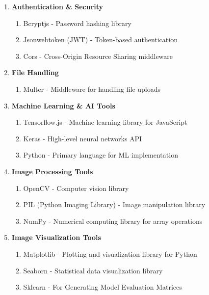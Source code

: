 \begin{enumerate}[label=\roman*.]
    \item \textbf{Authentication \& Security}
          \begin{enumerate}[label=$\bullet$]
              \item Bcryptjs \-- Password hashing library
              \item Jsonwebtoken (JWT) \-- Token-based authentication
              \item Cors \-- Cross-Origin Resource Sharing middleware
          \end{enumerate}

    \item \textbf{File Handling}
          \begin{enumerate}[label=$\bullet$]
              \item Multer \-- Middleware for handling file uploads
          \end{enumerate}

    \item \textbf{Machine Learning \& AI Tools}
          \begin{enumerate}[label=$\bullet$]
              \item Tensorflow.js \-- Machine learning library for JavaScript
              \item Keras \-- High-level neural networks API
              \item Python \-- Primary language for ML implementation
          \end{enumerate}

    \item \textbf{Image Processing Tools}
          \begin{enumerate}[label=$\bullet$]
              \item OpenCV \-- Computer vision library
              \item PIL (Python Imaging Library) \-- Image manipulation library
              \item NumPy \-- Numerical computing library for array operations
          \end{enumerate}

    \item \textbf{Image Visualization Tools}
          \begin{enumerate}[label=$\bullet$]
              \item Matplotlib \-- Plotting and visualization library for Python
              \item Seaborn \-- Statistical data visualization library
              \item Sklearn \-- For Generating Model Evaluation Matrices
          \end{enumerate}


\end{enumerate}
